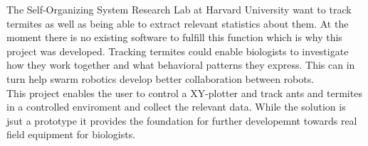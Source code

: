 


The Self-Organizing System Research Lab at Harvard University want to track termites as well as being able to extract relevant statistics about them. At the moment there is no existing software to fulfill this function which is why this project was developed. Tracking termites could enable biologists to investigate how they work together and what behavioral patterns they express. This can in turn help swarm robotics develop better collaboration between robots. \\

This project enables the user to control a XY-plotter and track ants and termites in a controlled enviroment and collect the relevant data. While the solution is jsut a prototype it provides the foundation for further developemnt towards real field equipment for biologists. 
